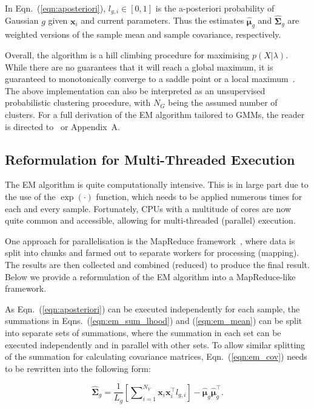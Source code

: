 \documentclass[10pt,a4paper]{article}
\def\Vec#1{{\boldsymbol{#1}}}
\def\Mat#1{{\boldsymbol{#1}}}
\begin{document}
In Eqn.~(\ref{eqn:aposteriori}), $l_{g,i} \in [0,1]$ is the {a-posteriori} probability of Gaussian $g$ given $\Vec{x}_i$ and current parameters.
Thus the estimates $\widehat{\Vec{\mu}}_g$ and $\widehat{\Mat{\Sigma}}_g$ are weighted versions of the
sample mean and sample covariance, respectively.

Overall, the algorithm is a hill climbing procedure for maximising $p(X | \lambda)$.
While there are no guarantees that it will reach a global maximum, it is guaranteed to monotonically converge to a saddle point or a local maximum~\cite{Dempster77,Duda01,Mitchell97}.
The above implementation can also be interpreted as an unsupervised probabilistic clustering procedure,
with $N_G$ being the assumed number of clusters.
For a full derivation of the EM algorithm tailored to GMMs, the reader is directed to~\cite{Bilmes98,Redner84} or Appendix~A. %

\subsection{Reformulation for Multi-Threaded Execution}
\label{sec:param_em_parallel}

The EM algorithm is quite computationally intensive.
This is in large part due to the use of the {$\exp(\cdot)$} function, which needs to be applied numerous times for each and every sample.
Fortunately, CPUs with a multitude of cores are now quite common and accessible, allowing for multi-threaded (parallel) execution.

One approach for parallelisation is the MapReduce framework~\cite{MapReduce_2004},
where data is split into chunks and farmed out to separate workers for processing (mapping).
The results are then collected and combined (reduced) to produce the final result.
Below we provide a reformulation of the EM algorithm into a MapReduce-like framework.

As Eqn.~(\ref{eqn:aposteriori}) can be executed independently for each sample,
the summations in Eqns.~(\ref{eqn:em_sum_lhood}) and (\ref{eqn:em_mean}) can be split into separate sets of summations,
where the summation in each set can be executed independently and in parallel with other sets.
To allow similar splitting of the summation for calculating covariance matrices,
Eqn.~(\ref{eqn:em_cov}) needs to be rewritten into the following form:

\vspace{-3ex}
\begin{equation}
  \widehat{\Mat{\Sigma}}_g = \frac{1}{L_g} \left[ \sum\nolimits_{i=1}^{N_V} \Vec{x}_i \Vec{x}_i^\top l_{g,i} \right] - \widehat{\Vec{\mu}}_g \widehat{\Vec{\mu}}_g^\top.
\end{equation}
\end{document}
